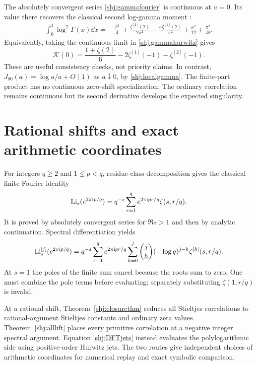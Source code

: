 The absolutely convergent series \eqref{shj:gammafourier} is continuous at $a=0$. Its value there recovers the classical second log-gamma moment \cite{shj:EM}:
\begin{align}
\int_0^1\log^2\Gamma(x)\dd x={}&
\frac{\ell^2}{4}+\frac{\zeta^{[2]}(2)}{2\pi^2}
-\frac{\kappa\zeta^{[1]}(2)}{\pi^2}
+\frac{\kappa^2}{12}+\frac{\pi^2}{48}.
\label{shj:classicalmoment}
\end{align}
Equivalently, taking the continuous limit in \eqref{shj:gammahurwitz} gives
\[
\mathcal K(0)=\frac{1+\zeta(2)}6-2\zeta^{[1]}(-1)-\zeta^{[2]}(-1).
\]
These are useful consistency checks, not priority claims. In contrast,
$J_{00}(a)=\log a/a+O(1)$ as $a\downarrow0$, by \eqref{shj:localgamma}. The finite-part product has no continuous zero-shift specialization. The ordinary correlation remains continuous but its second derivative develops the expected singularity.

\section{Rational shifts and exact arithmetic coordinates}\label{shj:rationals}
For integers $q\ge2$ and $1\le p<q$, residue-class decomposition gives the classical finite Fourier identity
\begin{equation}\label{shj:DFT}
\operatorname{Li}_s(e^{2\pi\mathrm{i} p/q})
=q^{-s}\sum_{r=1}^q e^{2\pi\mathrm{i} pr/q}\zeta(s,r/q).
\end{equation}
It is proved by absolutely convergent series for $\Re s>1$ and then by analytic continuation. Spectral differentiation yields
\begin{align}
\operatorname{Li}_s^{[j]}(e^{2\pi\mathrm{i} p/q})
=q^{-s}\sum_{r=1}^q e^{2\pi\mathrm{i} pr/q}
\sum_{h=0}^j\binom jh(-\log q)^{j-h}\zeta^{[h]}(s,r/q).
\label{shj:DFTjets}
\end{align}
At $s=1$ the poles of the finite sum cancel because the roots sum to zero. One must combine the pole terms before evaluating; separately substituting $\zeta(1,r/q)$ is invalid.

At a rational shift, Theorem~\ref{shj:closurethm} reduces all Stieltjes correlations to rational-argument Stieltjes constants and ordinary zeta values. Theorem~\ref{shj:alllift} places every primitive correlation at a negative integer spectral argument. Equation \eqref{shj:DFTjets} instead evaluates the polylogarithmic side using positive-order Hurwitz jets. The two routes give independent choices of arithmetic coordinates for numerical replay and exact symbolic comparison.

